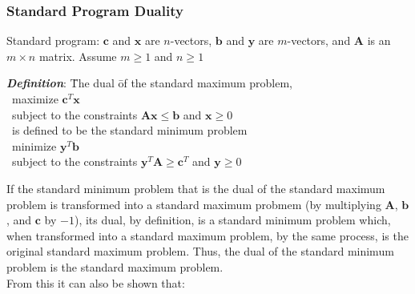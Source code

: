 \documentclass[10pt,letterpaper]{scrartcl}
\newcommand{\boph}[1]{\emph{\textbf{#1}}} %
\begin{document}
\subsubsection*{Standard Program Duality}
Standard program: $\mathbf{c}$ and $\mathbf{x}$ are $n$-vectors, $\mathbf{b}$ and $\mathbf{y}$ are $m$-vectors, and $\mathbf{A}$ is an $m\times n$ matrix. Assume $m\geq 1$ and $n\geq 1$ \\
\begin{tabbing}
	\boph{Definition}: \= The dual \= of the standard maximum problem, \\
	\>\>\ maximize $\mathbf{c}^T\mathbf{x}$ \\
	\>\>\ subject to the constraints $\mathbf{Ax}\leq\mathbf{b}$ and $\mathbf{x}\geq 0$ \\
	\>\ is defined to be the standard minimum problem \\
	\>\>\ minimize $\mathbf{y}^T\mathbf{b}$ \\
	\>\>\ subject to the constraints $\mathbf{y}^T\mathbf{A}\geq\mathbf{c}^T$ and $\mathbf{y}\geq 0$\end{tabbing}
	If the standard minimum problem that is the dual of the standard maximum problem is transformed into a standard maximum probmem (by multiplying $\mathbf{A}$, $\mathbf{b}$, and $\mathbf{c}$ by $-1$), its dual, by definition, is a standard minimum problem which, when transformed into a standard maximum problem, by the same process, is the original standard maximum problem. Thus, the dual of the standard minimum problem is the standard maximum problem. \\
	From this it can also be shown that: \\
\end{document}
